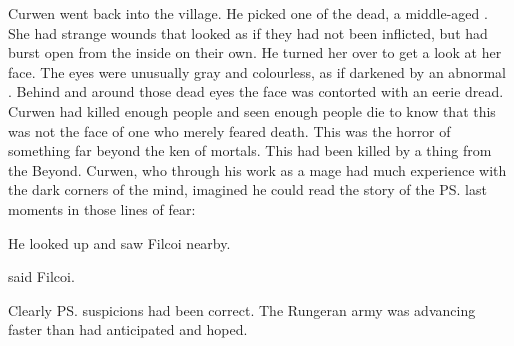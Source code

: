Curwen went back into the village. 
He picked one of the  dead, a middle-aged \sphyle. 
She had strange wounds that looked as if they had not been inflicted, but had burst open from the inside on their own. 
He turned her over to get a look at her face. 
The eyes were unusually gray and colourless, as if darkened by an abnormal . 
Behind and around those dead eyes the face was contorted with an eerie dread. 
Curwen had killed enough people and seen enough people die to know that this was not the face of one who merely feared death. 
This was the horror of something far beyond the ken of mortals. 
This \scatha{} had been killed by a thing from the Beyond. 
Curwen, who through his work as a mage had much experience with the dark corners of the mind, imagined he could read the story of the \ps{\sphyle} last moments in those lines of fear: 

He looked up and saw Filcoi nearby. 

 said Filcoi. 

% 
% 
% 
% 
Clearly \ps{\Dornaer} suspicions had been correct. 
The Rungeran army was advancing faster than \Sethgal{} had anticipated and hoped. 
     
